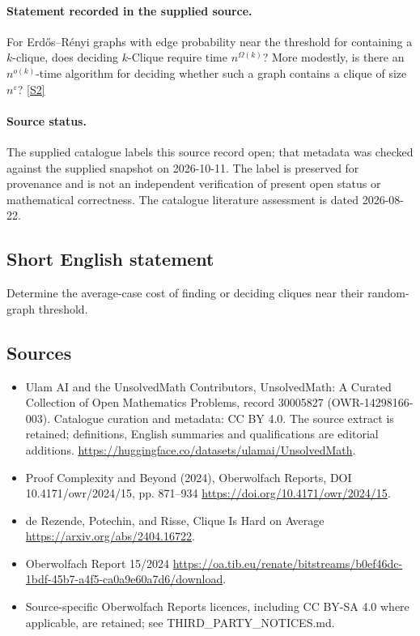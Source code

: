 \documentclass[11pt]{article}
\begin{document}
\paragraph{Statement recorded in the supplied source.}
For Erdős–Rényi graphs with edge probability near the threshold for containing a $k$-clique, does deciding $k$-Clique require time $n^{\Omega(k)}$? More modestly, is there an $n^{o(k)}$-time algorithm for deciding whether such a graph contains a clique of size $n^\varepsilon$? \href{https://doi.org/10.4171/owr/2024/15}{[S2]}
\paragraph{Source status.}
The supplied catalogue labels this source record open; that metadata was checked against the supplied snapshot on 2026-10-11. The label is preserved for provenance and is not an independent verification of present open status or mathematical correctness. The catalogue literature assessment is dated 2026-08-22.
\subsection{Short English statement}
Determine the average-case cost of finding or deciding cliques near their random-graph threshold.
\subsection{Sources}
\begin{itemize}
\item[S1] Ulam AI and the UnsolvedMath Contributors, UnsolvedMath: A Curated Collection of Open Mathematics Problems, record 30005827 (OWR-14298166-003). Catalogue curation and metadata: CC BY 4.0. The source extract is retained; definitions, English summaries and qualifications are editorial additions.
\url{https://huggingface.co/datasets/ulamai/UnsolvedMath}.
\item[S2] Proof Complexity and Beyond (2024), Oberwolfach Reports, DOI 10.4171/owr/2024/15, pp. 871--934
\url{https://doi.org/10.4171/owr/2024/15}.
\item[S3] de Rezende, Potechin, and Risse, Clique Is Hard on Average
\url{https://arxiv.org/abs/2404.16722}.
\item[S4] Oberwolfach Report 15/2024
\url{https://oa.tib.eu/renate/bitstreams/b0ef46dc-1bdf-45b7-a4f5-ca0a9e60a7d6/download}.
\item Source-specific Oberwolfach Reports licences, including CC BY-SA 4.0 where applicable, are retained; see THIRD\_PARTY\_NOTICES.md.
\end{itemize}
\end{document}
